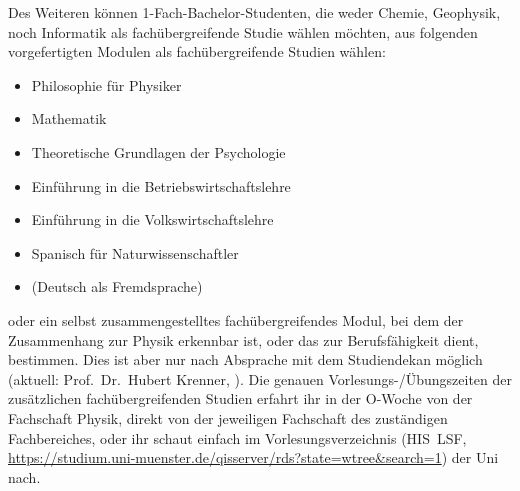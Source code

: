 {\small
Des Weiteren können 1-Fach-Bachelor-Studenten, die weder Chemie, Geophysik, noch Informatik als fachübergreifende Studie wählen möchten, aus folgenden vorgefertigten Modulen als fachübergreifende Studien wählen:
\begin{itemize}[nosep]
	\item Philosophie für Physiker
	\item Mathematik
	\item Theoretische Grundlagen der Psychologie
	\item Einführung in die Betriebswirtschaftslehre
	\item Einführung in die Volkswirtschaftslehre
	\item Spanisch für Naturwissenschaftler
	\item (Deutsch als Fremdsprache)
\end{itemize}
oder ein selbst zusammengestelltes fachübergreifendes Modul, bei dem der Zusammenhang zur Physik erkennbar ist, oder das zur Berufsfähigkeit dient, bestimmen.
Dies ist aber nur nach Absprache mit dem Studiendekan möglich (aktuell: Prof.\ Dr.\ Hubert Krenner, ).
Die genauen Vorlesungs-/Übungszeiten der zusätzlichen fachübergreifenden Studien erfahrt ihr in der O-Woche von der Fachschaft Physik, direkt von der jeweiligen Fachschaft des zuständigen Fachbereiches, oder ihr schaut einfach im Vorlesungsverzeichnis (HIS~LSF, \url{https://studium.uni-muenster.de/qisserver/rds?state=wtree&search=1}) der Uni nach.
}
